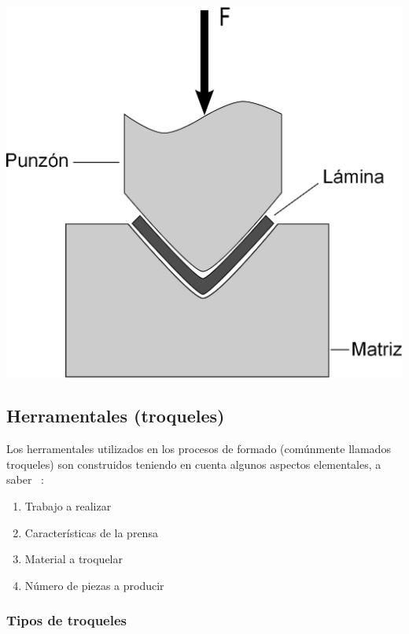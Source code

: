 \begin{center}
\includegraphics[scale=0.6]{src/ch2/doblado_v.eps}
\label{fig:doblado_v}
\end{center}






\subsection{Herramentales (troqueles)}

Los herramentales utilizados en los procesos de formado (comúnmente llamados troqueles) son 
construidos teniendo en cuenta algunos aspectos elementales, a saber ~\cite{marin2009}:

\begin{enumerate}
\item Trabajo a realizar 
\item Características de la prensa
\item Material a troquelar
\item Número de piezas a producir
\end{enumerate}

\subsubsection{Tipos de troqueles}

